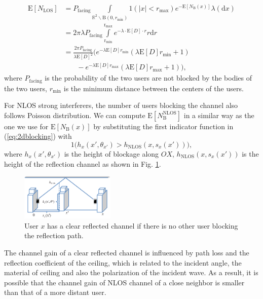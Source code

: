 \documentclass[10pt, conference, letterpaper]{IEEEtran}
\begin{document}
\begin{equation}
\begin{aligned}
\mathrm{E}[N_{\text{LOS}}] & = P_{\text{facing}}\int\limits_{\mathbb{R}^2\backslash\mathrm{B}(0,r_{\text{min}})}
\text{1}(|x|<r_{\text{max}})e^{-\mathrm{E}[N_{\mathrm{B}}(x)]}\lambda(\mathrm{d}x)\\
&= 2\pi\lambda P_{\text{facing}}\int\limits_{\mathrm{r_{min}}}^{\mathrm{r_{max}}}e^{-\lambda\cdot\mathrm{E}[D]\cdot r}r\mathrm{d}r\\
& =\frac{2\pi P_{\text{facing}}}{\lambda \mathrm{E}[D]^2}\big( e^{-\lambda\mathrm{E}[D]r_{\mathrm{min}}}(\lambda\mathrm{E}[D]r_{\mathrm{min}} + 1)\\
& \phantom{{}=1} - e^{-\lambda\mathrm{E}[D]r_{\mathrm{max}}}(\lambda\mathrm{E}[D]r_{\mathrm{max}} + 1)\big),
\end{aligned} 
\end{equation}
where $P_{\text{facing}}$ is the probability of the two users are not blocked by the bodies of the two users, $r_{\mathrm{min}}$ is the minimum distance between the centers of the users.

For NLOS strong interferers, the number of users blocking the channel also follows Poisson distribution. We can compute $\mathrm{E}[N_{\mathrm{B}}^{\mathrm{NLOS}}]$ in a similar way as the one we use for $\mathrm{E}[N_{\mathrm{B}}(x)]$ by substituting the first indicator function in (\ref{eq:2dblocking}) with 
$$\mathrm{1}\big(h_{x}(x',\theta_{x'}) > h_{\mathrm{NLOS}}(x, s_x(x'))  \big),$$
where $h_{x}(x',\theta_{x'}) $ is the height of blockage along $OX$, $h_{\mathrm{NLOS}}(x, s_x(x'))$ is the height of the reflection channel as shown in Fig. \ref{fig:NLOS}. 


\begin{figure}
	\centering
	\includegraphics[width = 0.4\textwidth]{NLOS.pdf}
	\caption{User $x$ has a clear reflected channel if there is no other user blocking the reflection path. }
	\label{fig:NLOS}
\end{figure}

The channel gain of a clear reflected channel is influenced by path loss and the reflection coefficient of the ceiling, which is related to the incident angle, the material of ceiling and also the polarization of the incident wave. As a result, it is possible that the channel gain of NLOS channel of a close neighbor is smaller than that of a more distant user.
\end{document}

